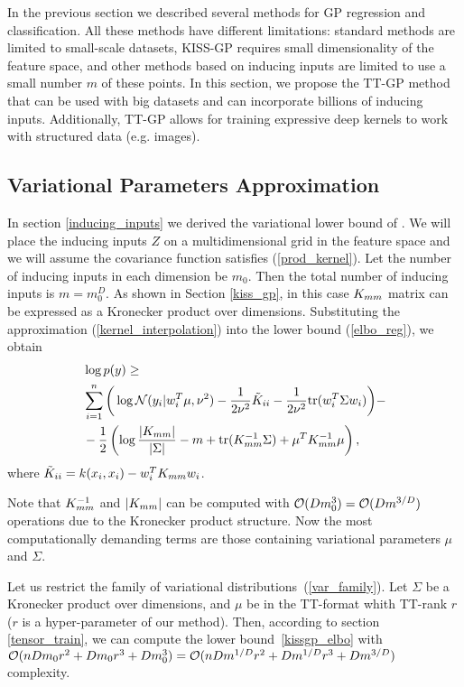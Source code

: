 In the previous section we described several methods for GP regression and
classification. All these methods have different limitations: standard methods
are limited to small-scale datasets, KISS-GP requires small dimensionality of
the feature space, and other methods based on inducing inputs are limited to use
a small number $m$ of these points. In this section, we propose the TT-GP method
that can be used with big datasets and can incorporate billions of inducing
inputs. Additionally, TT-GP allows for training expressive deep kernels to work
with structured data (e.g. images).

\subsection{Variational Parameters Approximation}
  In section \ref{inducing_inputs} we derived the variational lower bound of
  \citet{hensman2013}. We will place the inducing inputs $Z$ on a
  multidimensional grid in the feature space and we will assume the
  covariance function satisfies (\ref{prod_kernel}). Let the number
  of inducing inputs in each dimension be $m_0$. Then the total number of inducing 
  inputs is $m = m_0^D$.
  As shown in Section \ref{kiss_gp},
  in this case $K_{mm}$ matrix can be expressed as a Kronecker product over
  dimensions. Substituting the approximation (\ref{kernel_interpolation}) into
  the lower bound (\ref{elbo_reg}), we obtain
  \begin{equation}
  \label{kissgp_elbo}
    \begin{split}
      &\log p(y) \ge
        \\
        &\sum_{i=1}^n \bigg ( \log \mathcal{N} (y_i | w_i^T \mu, \nu^2) -
        \frac 1 {2\nu^2} \tilde K_{ii} - 
        \frac 1 {2\nu^2} \mbox{tr} (w_i^T \Sigma w_i)
      \bigg )-
      \\
      &- \frac 1 2 \left(
        \log \frac {|K_{mm}|} {|\Sigma|} - m + \mbox{tr}(K_{mm}^{-1} \Sigma) +
        \mu^T K_{mm}^{-1} \mu
      \right),
    \end{split}
  \end{equation}
  where $\tilde K_{ii} = k(x_i, x_i) - w_i^T K_{mm} w_i$.

  Note that $K_{mm}^{-1}$ and $|K_{mm}|$ can be computed with
  $\mathcal{O}(D m_0^3) = \mathcal{O}(D m^{3/D})$ operations due to the
  Kronecker product structure. Now the most computationally demanding terms
  are those containing variational parameters $\mu$ and $\Sigma$.

  Let us restrict the family of variational distributions~(\ref{var_family}). Let $\Sigma$ be
  a Kronecker product over dimensions, and $\mu$ be in the TT-format whith 
  TT-rank $r$ ($r$ is a hyper-parameter of our method). Then, according to 
  section \ref{tensor_train}, we can compute the lower bound~\eqref{kissgp_elbo}
  with
  $\mathcal{O}(nDm_0 r^2 + D m_0 r^3 + Dm_0^3) =
  \mathcal{O}(nD m^{1/D} r^2 + D m^{1/D} r^3 + D m^{3/D})$ complexity.


